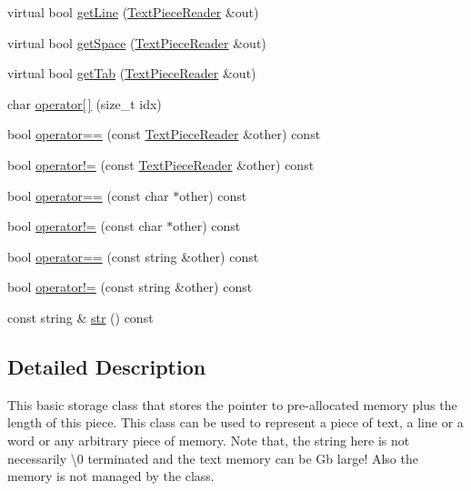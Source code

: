 \begin{DoxyCompactItemize}
\item 
virtual bool \hyperlink{classuva_1_1smt_1_1file_1_1_text_piece_reader_a7acc5dd0f43ae171e0b2a72186522ad5}{get\+Line} (\hyperlink{classuva_1_1smt_1_1file_1_1_text_piece_reader}{Text\+Piece\+Reader} \&out)
\item 
virtual bool \hyperlink{classuva_1_1smt_1_1file_1_1_text_piece_reader_a019fdf0f8466a3bef555fffa00757258}{get\+Space} (\hyperlink{classuva_1_1smt_1_1file_1_1_text_piece_reader}{Text\+Piece\+Reader} \&out)
\item 
virtual bool \hyperlink{classuva_1_1smt_1_1file_1_1_text_piece_reader_af91a7441ce668c5f787c176372772b6e}{get\+Tab} (\hyperlink{classuva_1_1smt_1_1file_1_1_text_piece_reader}{Text\+Piece\+Reader} \&out)
\item 
char \hyperlink{classuva_1_1smt_1_1file_1_1_text_piece_reader_a5376b4b8959655f6358a0f235717cdcb}{operator\mbox{[}$\,$\mbox{]}} (size\+\_\+t idx)
\item 
bool \hyperlink{classuva_1_1smt_1_1file_1_1_text_piece_reader_a4264db91dd876c51d5ff9db7f1be9fdc}{operator==} (const \hyperlink{classuva_1_1smt_1_1file_1_1_text_piece_reader}{Text\+Piece\+Reader} \&other) const 
\item 
bool \hyperlink{classuva_1_1smt_1_1file_1_1_text_piece_reader_a367d8f9db1bbf2839d00338c34171d74}{operator!=} (const \hyperlink{classuva_1_1smt_1_1file_1_1_text_piece_reader}{Text\+Piece\+Reader} \&other) const 
\item 
bool \hyperlink{classuva_1_1smt_1_1file_1_1_text_piece_reader_abce63ed3f33759b19852a48473322065}{operator==} (const char $\ast$other) const 
\item 
bool \hyperlink{classuva_1_1smt_1_1file_1_1_text_piece_reader_ab21ec7b8eb9232fa9ed279681fe1e524}{operator!=} (const char $\ast$other) const 
\item 
bool \hyperlink{classuva_1_1smt_1_1file_1_1_text_piece_reader_ac9de17ddb835ea3d050c189e4b51b5fd}{operator==} (const string \&other) const 
\item 
bool \hyperlink{classuva_1_1smt_1_1file_1_1_text_piece_reader_a0ac2a6f3540cdd4b01abafabacf9afee}{operator!=} (const string \&other) const 
\item 
const string \& \hyperlink{classuva_1_1smt_1_1file_1_1_text_piece_reader_a190e5aa94efc0c51ead8cf558cad6c0a}{str} () const 
\end{DoxyCompactItemize}


\subsection{Detailed Description}
This basic storage class that stores the pointer to pre-\/allocated memory plus the length of this piece. This class can be used to represent a piece of text, a line or a word or any arbitrary piece of memory. Note that, the string here is not necessarily \textbackslash{}0 terminated and the text memory can be Gb large! Also the memory is not managed by the class. 


